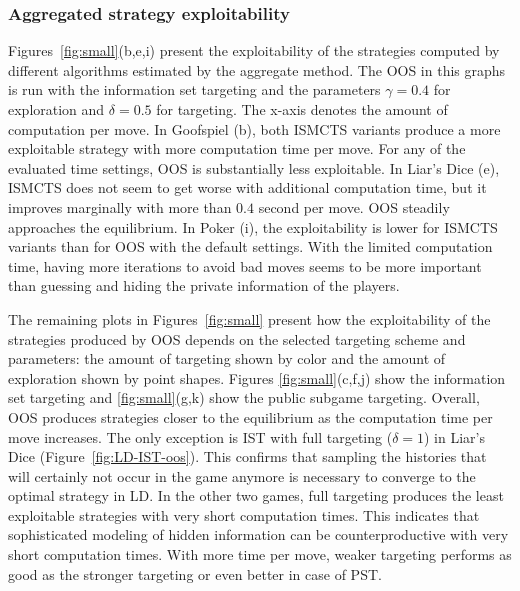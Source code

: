 \documentclass{aamas2015}
\newcounter{vlNoteCounter}
\newcommand{\vlnote}[1]{{\scriptsize \color{blue} $\blacksquare$ \refstepcounter{vlNoteCounter}\textsf{[VL]$_{\arabic{vlNoteCounter}}$:{#1}}}}
\renewcommand{\vlnote}[1]{}
\begin{document}
\subsubsection{Aggregated strategy exploitability}

Figures~\ref{fig:small}(b,e,i) present the exploitability of the strategies computed by different algorithms estimated by the aggregate method.%
The OOS in this graphs is run with the information set targeting and the parameters $\gamma=0.4$ for exploration and $\delta=0.5$ for targeting.
The x-axis denotes the amount of computation per move.
In Goofspiel (b), both ISMCTS variants  produce a more exploitable strategy with more computation time per move.
For any of the evaluated time settings, OOS is substantially less exploitable.
In Liar's Dice (e), ISMCTS does not seem to get worse with additional computation time, but it improves marginally with more than $0.4$ second per move.
OOS steadily approaches the equilibrium.
In Poker (i), the exploitability is lower for ISMCTS variants than for OOS with the default settings.
With the limited computation time, having more iterations to avoid bad moves seems to be more important than guessing and hiding the private information of the players.

The remaining plots in Figures~\ref{fig:small} present how the exploitability of the strategies produced by OOS depends on the selected targeting scheme and parameters: the amount of targeting shown by color and the amount of exploration shown by point shapes. Figures \ref{fig:small}(c,f,j) show the information set targeting and \ref{fig:small}(g,k) show the public subgame targeting. Overall, OOS produces strategies closer to the equilibrium as the computation time per move increases. The only exception is IST with full targeting ($\delta=1$) in Liar's Dice (Figure~\ref{fig:LD-IST-oos}). This confirms that sampling the histories that will certainly not occur in the game anymore is necessary to converge to the optimal strategy in LD.
In the other two games, full targeting produces the least exploitable strategies with very short computation times. This indicates that sophisticated modeling of hidden information can be counterproductive with very short computation times. With more time per move, weaker targeting performs as good as the stronger targeting or even better in case of PST.

\vlnote{the next paragraph can be removed to save space}
\end{document}
